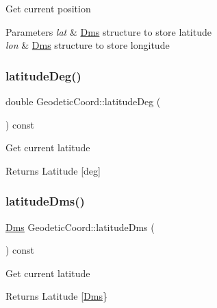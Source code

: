 Get current position 
\begin{DoxyParams}{Parameters}
{\em lat} & \mbox{\hyperlink{struct_m210_1_1_dms}{Dms}} structure to store latitude \\
\hline
{\em lon} & \mbox{\hyperlink{struct_m210_1_1_dms}{Dms}} structure to store longitude \\
\hline
\end{DoxyParams}
\mbox{\label{class_m210_1_1_geodetic_coord_ad5ade40ea0085e303396ffaec259aec7}} 
\subsubsection{\texorpdfstring{latitude\+Deg()}{latitudeDeg()}}
{\footnotesize\ttfamily double Geodetic\+Coord\+::latitude\+Deg (\begin{DoxyParamCaption}{ }\end{DoxyParamCaption}) const}

Get current latitude \begin{DoxyReturn}{Returns}
Latitude \mbox{[}deg\mbox{]} 
\end{DoxyReturn}
\mbox{\label{class_m210_1_1_geodetic_coord_ac55715a3e4b46492ec8c2fe497bcd1c0}} 
\subsubsection{\texorpdfstring{latitude\+Dms()}{latitudeDms()}}
{\footnotesize\ttfamily \mbox{\hyperlink{struct_m210_1_1_dms}{Dms}} Geodetic\+Coord\+::latitude\+Dms (\begin{DoxyParamCaption}{ }\end{DoxyParamCaption}) const}

Get current latitude \begin{DoxyReturn}{Returns}
Latitude \mbox{[}\mbox{\hyperlink{struct_m210_1_1_dms}{Dms}}\} 
\end{DoxyReturn}
\mbox{\label{class_m210_1_1_geodetic_coord_aaeb0aa298f82f3c8c122be133f2cedf3}} 
